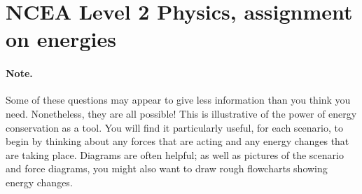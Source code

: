 \documentclass[answers]{exam}
\begin{document}
\section*{NCEA Level 2 Physics, assignment on energies}

\paragraph{Note.} Some of these questions may appear to give less information than you think you need. Nonetheless,
they are all possible! This is illustrative of the power of energy conservation as a tool. You will find it particularly
useful, for each scenario, to begin by thinking about any forces that are acting and any energy changes that are
taking place. Diagrams are often helpful; as well as pictures of the scenario and force diagrams, you might also
want to draw rough flowcharts showing energy changes.
\end{document}
